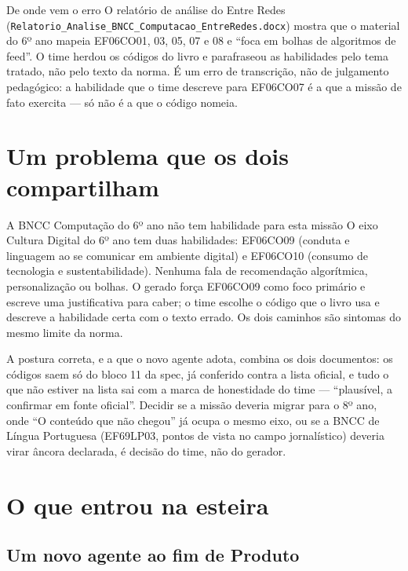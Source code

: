 \documentclass[11pt,a4paper]{article}
\newcommand{\arq}[1]{\texttt{\small #1}}
\begin{document}
\begin{notabox}{De onde vem o erro}
O relatório de análise do Entre Redes (\arq{Relatorio\_Analise\_BNCC\_Computacao\_EntreRedes.docx}) mostra que o material do 6º ano mapeia EF06CO01, 03, 05, 07 e 08 e ``foca em bolhas de algoritmos de feed''. O time herdou os códigos do livro e parafraseou as habilidades pelo tema tratado, não pelo texto da norma. É um erro de transcrição, não de julgamento pedagógico: a habilidade que o time descreve para EF06CO07 é a que a missão de fato exercita --- só não é a que o código nomeia.
\end{notabox}

\section{Um problema que os dois compartilham}

\begin{notabox}{A BNCC Computação do 6º ano não tem habilidade para esta missão}
O eixo Cultura Digital do 6º ano tem duas habilidades: EF06CO09 (conduta e linguagem ao se comunicar em ambiente digital) e EF06CO10 (consumo de tecnologia e sustentabilidade). Nenhuma fala de recomendação algorítmica, personalização ou bolhas. O gerado força EF06CO09 como foco primário e escreve uma justificativa para caber; o time escolhe o código que o livro usa e descreve a habilidade certa com o texto errado. Os dois caminhos são sintomas do mesmo limite da norma.

A postura correta, e a que o novo agente adota, combina os dois documentos: os códigos saem só do bloco 11 da spec, já conferido contra a lista oficial, e tudo o que não estiver na lista sai com a marca de honestidade do time --- ``plausível, a confirmar em fonte oficial''. Decidir se a missão deveria migrar para o 8º ano, onde ``O conteúdo que não chegou'' já ocupa o mesmo eixo, ou se a BNCC de Língua Portuguesa (EF69LP03, pontos de vista no campo jornalístico) deveria virar âncora declarada, é decisão do time, não do gerador.
\end{notabox}

\section{O que entrou na esteira}

\subsection{Um novo agente ao fim de Produto}
\end{document}
